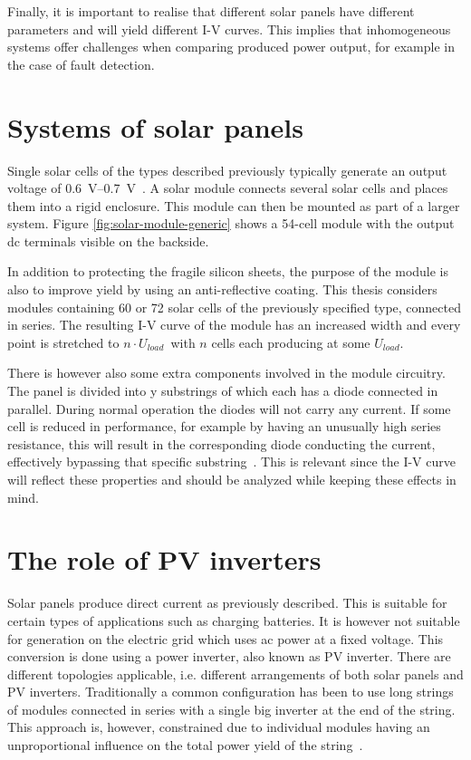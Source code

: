 Finally, it is important to realise that different solar panels have different parameters and will yield different I-V curves.
This implies that inhomogeneous systems offer challenges when comparing produced power output, for example in the case of fault detection.

\section{Systems of solar panels}
Single solar cells of the types described previously typically generate an output voltage of \SIrange{0.6}{0.7}{\volt}~\cite{Zhao2010thesis}.
A solar module connects several solar cells and places them into a rigid enclosure.
This module can then be mounted as part of a larger system.
Figure \ref{fig:solar-module-generic} shows a 54-cell module with the output dc terminals visible on the backside.


In addition to protecting the fragile silicon sheets, the purpose of the module is also to improve yield by using an anti-reflective coating.
This thesis considers modules containing 60 or 72 solar cells of the previously specified type, connected in series.
The resulting I-V curve of the module has an increased width and every point is stretched to $n \cdot U_{load}$ with $n$ cells each producing at some $U_{load}$.

There is however also some extra components involved in the module circuitry.
The panel is divided into y substrings of which each has a diode connected in parallel.
During normal operation the diodes will not carry any current.
If some cell is reduced in performance, for example by having an unusually high series resistance, this will result in the corresponding diode conducting the current, effectively bypassing that specific substring~\cite{Roman2006}.
This is relevant since the I-V curve will reflect these properties and should be analyzed while keeping these effects in mind.

\section{The role of PV inverters}
Solar panels produce direct current as previously described.
This is suitable for certain types of applications such as charging batteries.
It is however not suitable for generation on the electric grid which uses ac power at a fixed voltage.
This conversion is done using a power inverter, also known as PV inverter.
There are different topologies applicable, i.e. different arrangements of both solar panels and PV inverters.
Traditionally a common configuration has been to use long strings of modules connected in series with a single big inverter at the end of the string.
This approach is, however, constrained due to individual modules having an unproportional influence on the total power yield of the string~\cite{Roman2006}.


